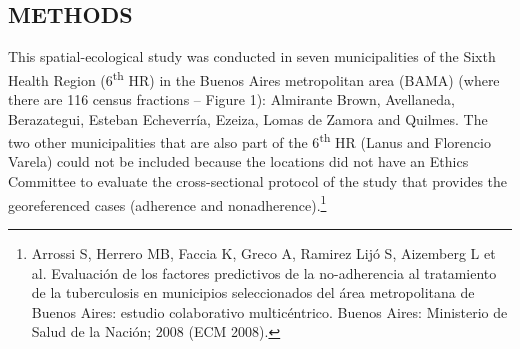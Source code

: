 \begin{multicols}{2}
\section*{METHODS}
\par{}This spatial-\allowbreak{}ecological study was conducted in seven municipalities of the Sixth Health Region (\allowbreak{}6\textsuperscript{th} HR)\allowbreak{} in the Buenos Aires metropolitan area (\allowbreak{}BAMA)\allowbreak{} (\allowbreak{}where there are 116 census fractions – Figure 1)\allowbreak{}:\allowbreak{} Almirante Brown,\allowbreak{} Avellaneda,\allowbreak{} Berazategui,\allowbreak{} Esteban Echeverría,\allowbreak{} Ezeiza,\allowbreak{} Lomas de Zamora and Quilmes.\allowbreak{} The two other municipalities that are also part of the 6\textsuperscript{th} HR (\allowbreak{}Lanus and Florencio Varela)\allowbreak{} could not be included because the locations did not have an Ethics Committee to evaluate the cross-\allowbreak{}sectional protocol of the study that provides the georeferenced cases (\allowbreak{}adherence and nonadherence)\allowbreak{}.\allowbreak{}\protect\footnote{ Arrossi S,\allowbreak{} Herrero MB,\allowbreak{} Faccia K,\allowbreak{} Greco A,\allowbreak{} Ramirez Lijó S,\allowbreak{} Aizemberg L et al.\allowbreak{} Evaluación de los factores predictivos de la no-\allowbreak{}adherencia al tratamiento de la tuberculosis en municipios seleccionados del área metropolitana de Buenos Aires:\allowbreak{} estudio colaborativo multicéntrico.\allowbreak{} Buenos Aires:\allowbreak{} Ministerio de Salud de la Nación; 2008 (\allowbreak{}ECM 2008)\allowbreak{}.\allowbreak{}}\par{}
\par
{
}
\end{multicols}
